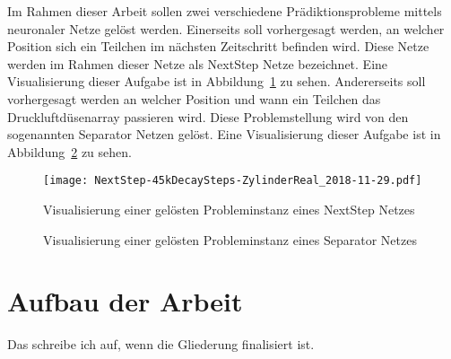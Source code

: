 Im Rahmen dieser Arbeit sollen zwei verschiedene Prädiktionsprobleme mittels neuronaler Netze gelöst werden.
Einerseits soll vorhergesagt werden, an welcher Position sich ein Teilchen im nächsten Zeitschritt befinden wird.
Diese Netze werden im Rahmen dieser Netze als NextStep Netze bezeichnet.
Eine Visualisierung dieser Aufgabe ist in Abbildung~\ref{fig:visualsNextstep} zu sehen.
Andererseits soll vorhergesagt werden an welcher Position und wann ein Teilchen das Druckluftdüsenarray passieren wird.
Diese Problemstellung wird von den sogenannten Separator Netzen gelöst.
Eine Visualisierung dieser Aufgabe ist in Abbildung~\ref{fig:visualsSeparator} zu sehen.


\begin{figure}[h]
    \centering
    \texttt{[image: NextStep-45kDecaySteps-ZylinderReal\_2018-11-29.pdf]}
    \caption{Visualisierung einer gelösten Probleminstanz eines NextStep Netzes}
    \label{fig:visualsNextstep}
\end{figure}


\begin{figure}[h]
    \centering
	\caption{Visualisierung einer gelösten Probleminstanz eines Separator Netzes}
	\label{fig:visualsSeparator}
\end{figure}



\section{Aufbau der Arbeit}

Das schreibe ich auf, wenn die Gliederung finalisiert ist.


